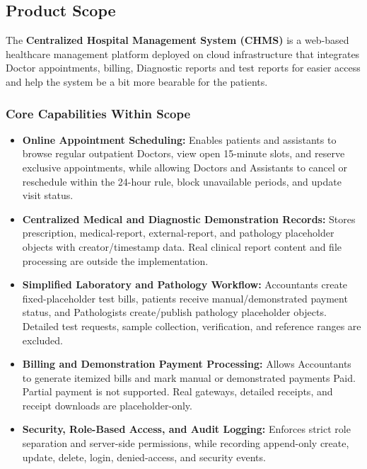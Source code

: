 \documentclass[11pt,a4paper]{article}
\begin{document}
\subsection{Product Scope}
The \textbf{Centralized Hospital Management System (CHMS)} is a web-based healthcare management platform deployed on cloud infrastructure that integrates Doctor appointments, billing, Diagnostic reports and test reports for easier access and help the system be a bit more bearable for the patients.

\subsubsection{Core Capabilities Within Scope}
\begin{itemize}
    \item \textbf{Online Appointment Scheduling:} Enables patients and assistants to browse regular outpatient Doctors, view open 15-minute slots, and reserve exclusive appointments, while allowing Doctors and Assistants to cancel or reschedule within the 24-hour rule, block unavailable periods, and update visit status.

    \item \textbf{Centralized Medical and Diagnostic Demonstration Records:} Stores prescription, medical-report, external-report, and pathology placeholder objects with creator/timestamp data. Real clinical report content and file processing are outside the implementation.

    \item \textbf{Simplified Laboratory and Pathology Workflow:} Accountants create fixed-placeholder test bills, patients receive manual/demonstrated payment status, and Pathologists create/publish pathology placeholder objects. Detailed test requests, sample collection, verification, and reference ranges are excluded.

    \item \textbf{Billing and Demonstration Payment Processing:} Allows Accountants to generate itemized bills and mark manual or demonstrated payments Paid. Partial payment is not supported. Real gateways, detailed receipts, and receipt downloads are placeholder-only.

    \item \textbf{Security, Role-Based Access, and Audit Logging:} Enforces strict role separation and server-side permissions, while recording append-only create, update, delete, login, denied-access, and security events.

\end{itemize}
\end{document}
